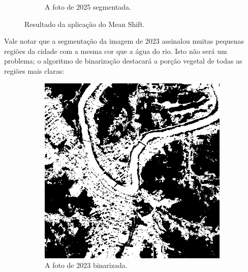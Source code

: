 \documentclass{article}
\begin{document}
\begin{figure}[H]
\begin{subfigure}[b]{0.48\textwidth}
        \caption{A foto de 2025 segmentada.}
        \label{2025}
    \end{subfigure}
    \caption{Resultado da aplicação do Mean Shift.}
    \label{segmentada}
\end{figure}

Vale notar que a segmentação da imagem de 2023 assinalou muitas pequenas regiões da cidade com a mesma cor que a água do rio. Isto não será um problema; o algoritmo de binarização destacará a porção vegetal de todas as regiões mais claras:

\begin{figure}[H]
    \centering
    \begin{subfigure}[b]{0.48\textwidth}
        \includegraphics[width=\textwidth]{../Imagens/012023_bin.png}
        \caption{A foto de 2023 binarizada.}
        \label{2023}
    \end{subfigure}
    \hfill %
    \begin{subfigure}[b]{0.48\textwidth}

\end{subfigure}
\end{figure}
\end{document}
